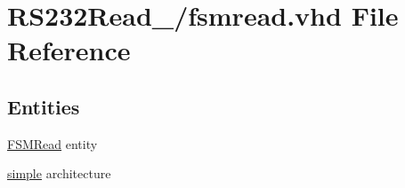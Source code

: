 \hypertarget{16_2_fsm_read_8vhd}{}\section{R\+S232\+Read\+\_/fsmread.vhd File Reference}
\label{16_2_fsm_read_8vhd}
\subsection*{Entities}
\begin{DoxyCompactItemize}
\item 
\hyperlink{class_f_s_m_read}{F\+S\+M\+Read} entity
\item 
\hyperlink{class_f_s_m_read_1_1simple}{simple} architecture
\end{DoxyCompactItemize}
